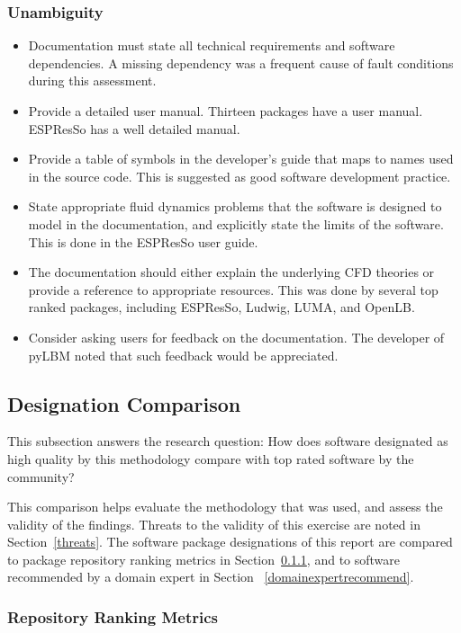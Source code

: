 \documentclass[final, 3p, times, authoryear]{elsarticle}
\begin{document}
\subsubsection{Unambiguity}

\begin{itemize}
	\item Documentation must state all technical requirements and software dependencies. A missing dependency was a frequent cause of fault conditions during this assessment.
	\item Provide a detailed user manual. Thirteen packages have a user manual. ESPResSo has a well detailed manual.
	\item Provide a table of symbols in the developer's guide that maps to names used in the source code. This is suggested as good software development practice.
	\item State appropriate fluid dynamics problems that the software is designed to model in the documentation, and explicitly state the limits of the software. This is done in the ESPResSo user guide.
	\item The documentation should either explain the underlying CFD theories or provide a reference to appropriate resources. This was done by several top ranked packages, including ESPResSo, Ludwig, LUMA, and OpenLB.
	\item Consider asking users for feedback on the documentation. The developer of pyLBM noted that such feedback would be appreciated.
\end{itemize}

\subsection{Designation Comparison} \label{comparison}

This subsection answers the research question: How does software designated as
high quality by this methodology compare with top rated software by the
community?

This comparison helps evaluate the methodology that was used, and assess the
validity of the findings. Threats to the validity of this exercise are noted in
Section~\ref{threats}. The software package designations of this report are
compared to package repository ranking metrics in Section~\ref{repmetrics}, and
to software recommended by a domain expert in Section
~\ref{domainexpertrecommend}.

\subsubsection{Repository Ranking Metrics} \label{repmetrics}
\end{document}

